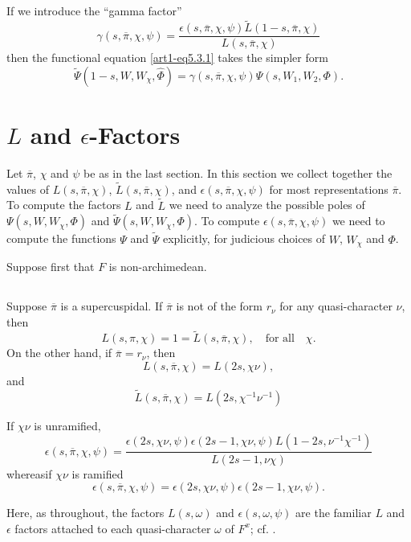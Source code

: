 \subsection{}\label{art1-sec5.5}
If we introduce the ``gamma factor''
$$
\gamma(s,\overline{\pi},\chi,\psi)=\dfrac{\epsilon(s,\overline{\pi},\chi,\psi)\widetilde{L}(1-s,\overline{\pi},\chi)}{L(s,\overline{\pi},\chi)}
$$
then the functional equation \eqref{art1-eq5.3.1} takes the simpler form
$$
\widetilde{\Psi}(1-s,W,W_{\chi},\widehat{\Phi})=\gamma(s,\overline{\pi},\chi,\psi)\Psi(s,W_{1},W_{2},\Phi).
$$

\section{$L$ and $\epsilon$-Factors}\label{art1-sec6}

Let $\overline{\pi}$, $\chi$ and $\psi$ be as in the last section. In this section we collect together the values of $L(s,\overline{\pi},\chi)$, $\widetilde{L}(s,\overline{\pi},\chi)$, and $\epsilon(s,\overline{\pi},\chi,\psi)$ for most representations $\overline{\pi}$. To compute the factors $L$ and $\widetilde{L}$ we need to analyze the possible poles of $\Psi(s,W,W_{\chi},\Phi)$ and $\widetilde{\Psi}(s,W,W_{\chi},\Phi)$. To compute $\epsilon(s,\overline{\pi},\chi,\psi)$ we need to compute the functions $\Psi$ and $\widetilde{\Psi}$ explicitly, for judicious choices of $W$, $W_{\chi}$ and $\Phi$.

Suppose first that $F$ is non-archimedean.

\subsection{}\label{art1-sec6.1}
Suppose $\overline{\pi}$ is a supercuspidal. If $\overline{\pi}$ is not of the form $r_{\nu}$ for any quasi-character $\nu$, then
$$
L(s,\pi,\chi)=1=\widetilde{L}(s,\overline{\pi},\chi),\quad\text{for all}\quad \chi.
$$
On the other hand, if $\overline{\pi}=r_{\nu}$, then
$$
L(s,\overline{\pi},\chi)=L(2s,\chi\nu),
$$
and
$$
\widetilde{L}(s,\overline{\pi},\chi)=L(2s,\chi^{-1}\nu^{-1})
$$

If $\chi\nu$ is unramified,
$$
\epsilon(s,\overline{\pi},\chi,\psi)=\frac{\epsilon(2s,\chi\nu,\psi)\epsilon(2s-1,\chi\nu,\psi)L(1-2s,\nu^{-1}\chi^{-1})}{L(2s-1,\nu\chi)}
$$
whereas\pageoriginale if $\chi\nu$ is ramified
$$
\epsilon(s,\overline{\pi},\chi,\psi)=\epsilon(2s,\chi\nu,\psi)\epsilon(2s-1,\chi\nu,\psi).
$$

Here, as throughout, the factors $L(s,\omega)$ and $\epsilon(s,\omega,\psi)$ are the familiar $L$ and $\epsilon$ factors attached to each quasi-character $\omega$ of $F^{x}$; cf. \cite[pp. 108-109]{Jacquet-Langlands}.

